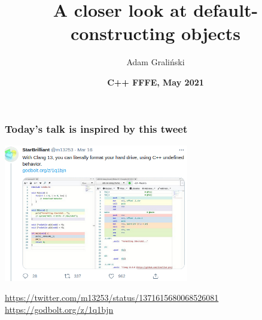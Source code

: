 \documentclass[aspectratio=169]{beamer}
\title[LTN06 :: =default]{A closer look at default-constructing objects}
\author{Adam Graliński}
\date[FFFE\_21]{\textbf{C++ {\color{red}F}{\color{blue}F}{\color{green}F}{\color{yellow}E}, May 2021}}
\begin{document}
{
\begin{frame}
\titlepage{}
\end{frame}
}

\begin{frame}
\frametitle{Today's talk is inspired by this tweet}
{\centering
\includegraphics[height=6cm]{pics/StarBrilliantTweet.png}

{\tiny
\url{https://twitter.com/m13253/status/1371615680068526081} \\
\url{https://godbolt.org/z/1q1bjn}
}

}
\end{frame}
\end{document}

